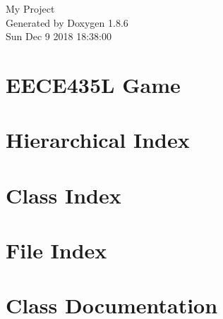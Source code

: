 \documentclass[twoside]{book}
\newcommand{\clearemptydoublepage}{%
  \newpage{\pagestyle{empty}\cleardoublepage}%
}
\begin{document}
\hypersetup{pageanchor=false}
\begin{titlepage}
\vspace*{7cm}
\begin{center}%
{\Large My Project }\\
\vspace*{1cm}
{\large Generated by Doxygen 1.8.6}\\
\vspace*{0.5cm}
{\small Sun Dec 9 2018 18:38:00}\\
\end{center}
\end{titlepage}
\clearemptydoublepage
\tableofcontents
\clearemptydoublepage
{}
\hypersetup{pageanchor=true}

\chapter{E\-E\-C\-E435\-L Game}
\label{index}\hypertarget{index}{}
\chapter{Hierarchical Index}

\chapter{Class Index}

\chapter{File Index}

\chapter{Class Documentation}

































\end{document}
